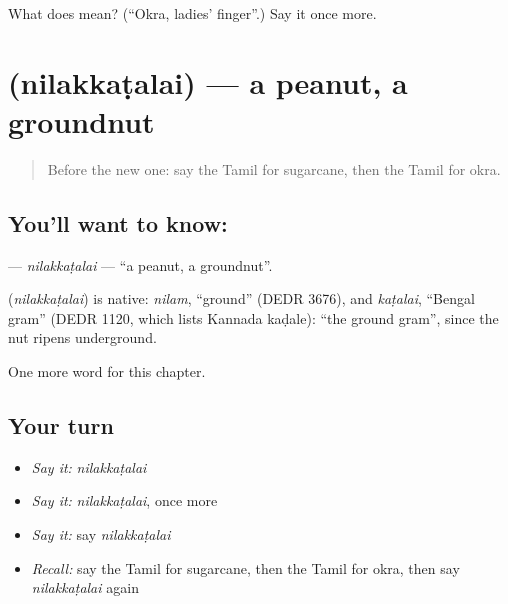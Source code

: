 \begin{tcolorbox}[breakable,colback=teal!4,colframe=teal!35!black,title={Before you move on}]
What does  mean? (\textquotedblleft{}Okra, ladies' finger\textquotedblright{}.) Say it once more.
\end{tcolorbox}
\section[\texorpdfstring{\ta{நிலக்கடலை} (nilakkaṭalai)}{நிலக்கடலை (nilakkaṭalai)}]{ (nilakkaṭalai) — a peanut, a groundnut}

\label{lesson:TA-C278-nilakkatalai}



\begin{quote}
Before the new one: say the Tamil for sugarcane, then the Tamil for okra.
\end{quote}

\subsection*{You'll want to know: }
\textbf{} — \emph{nilakkaṭalai} — \textquotedblleft{}a peanut, a groundnut\textquotedblright{}.

\begin{cousinweb}
\textbf{} (\emph{nilakkaṭalai}) is native: \emph{nilam}, \textquotedblleft{}ground\textquotedblright{} (DEDR 3676), and \emph{kaṭalai}, \textquotedblleft{}Bengal gram\textquotedblright{} (DEDR 1120, which lists Kannada kaḍale): \textquotedblleft{}the ground gram\textquotedblright{}, since the nut ripens underground.
\end{cousinweb}

\begin{grammarlens}[title={What you've built}]
One more word for this chapter.
\end{grammarlens}

\subsection*{Your turn}
\begin{itemize}
\raggedright
  \item \emph{Say it:} \emph{nilakkaṭalai}
  \item \emph{Say it:} \emph{nilakkaṭalai}, once more
  \item \emph{Say it:} say \emph{nilakkaṭalai}
  \item \emph{Recall:} say the Tamil for sugarcane, then the Tamil for okra, then say \emph{nilakkaṭalai} again
\end{itemize}

